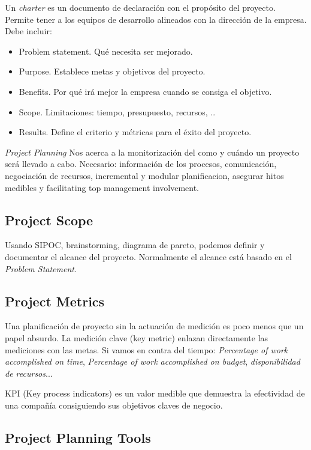 \documentclass[]{article}
\begin{document}
Un \textit{charter} es un documento de declaración con el propósito del proyecto.
Permite tener a los equipos de desarrollo alineados con la dirección de la empresa. Debe incluir: 

\begin{itemize}
	\item Problem statement. Qué necesita ser mejorado.
	\item Purpose. Establece metas y objetivos del proyecto.
	\item Benefits. Por qué irá mejor la empresa cuando se consiga el objetivo.
	\item Scope. Limitaciones: tiempo, presupuesto, recursos, ..
	\item Results. Define el criterio y métricas para el éxito del proyecto.
\end{itemize}

\textit{Project Planning} Nos acerca a la monitorización del como y cuándo un proyecto será llevado a cabo. Necesario: información de los procesos, comunicación, negociación de recursos, incremental y modular planificacion, asegurar hitos medibles y facilitating top management involvement.

\subsection{Project Scope}

Usando SIPOC, brainstorming, diagrama de pareto, podemos definir y documentar el alcance del proyecto. Normalmente el alcance está basado en el \textit{Problem Statement}.

\subsection{Project Metrics}

Una planificación de proyecto sin la actuación de medición es poco menos que un papel absurdo. La medición clave (key metric) enlazan directamente las mediciones con las metas. Si vamos en contra del tiempo: \textit{Percentage of work accomplished on time}, \textit{Percentage of work accomplished on budget}, \textit{disponibilidad de recursos}...

KPI (Key process indicators) es un valor medible que demuestra la efectividad de una compañía consiguiendo sus objetivos claves de negocio.

\subsection{Project Planning Tools}
\end{document}
